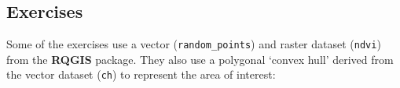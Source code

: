 \documentclass[]{krantz}
\newenvironment{Shaded}{\begin{snugshade}}{\end{snugshade}}
\newcommand{\KeywordTok}[1]{\textcolor[rgb]{0.27,0.27,0.27}{\textbf{#1}}}
\newcommand{\NormalTok}[1]{#1}
\newcommand{\OperatorTok}[1]{\textcolor[rgb]{0.43,0.43,0.43}{\textbf{#1}}}
\newcommand{\StringTok}[1]{\textcolor[rgb]{0.5,0.5,0.5}{#1}}
\begin{document}
\hypertarget{exercises-3}{%
\subsection{Exercises}\label{exercises-3}}

Some of the exercises use a vector (\texttt{random\_points}) and raster dataset (\texttt{ndvi}) from the \textbf{RQGIS} package.
They also use a polygonal `convex hull' derived from the vector dataset (\texttt{ch}) to represent the area of interest:

\begin{Shaded}
\end{Shaded}
\end{document}
